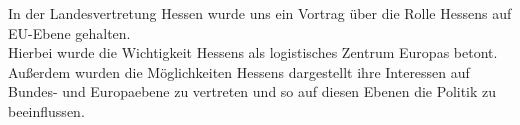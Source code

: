 \documentclass[12pt, letterpaper]{article}
\begin{document}
In der Landesvertretung Hessen wurde uns ein Vortrag über die Rolle Hessens auf EU-Ebene gehalten. \\
Hierbei wurde die Wichtigkeit Hessens als logistisches Zentrum Europas betont.
\\Außerdem wurden die Möglichkeiten Hessens dargestellt ihre Interessen auf Bundes- und Europaebene zu vertreten und so auf diesen Ebenen die Politik zu beeinflussen.
\end{document}
